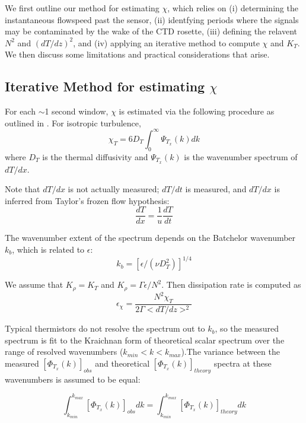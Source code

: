 \documentclass{ametsoc}
\begin{document}
We first outline our method for estimating $\chi$, which relies on (i) determining the instantaneous flowspeed past the sensor, (ii) identfying periods where the signals may be contaminated by the wake of the CTD rosette, (iii) defining the relavent $N^2$ and $(dT/dz)^2$, and (iv) applying an iterative method to compute $\chi$ and $K_T$. We then discuss some limitations and practical considerations that arise.

\subsection{Iterative Method for estimating $\chi$}

For each $\sim$1 second window, $\chi$ is estimated via the following procedure as outlined in \cite{moumnash09}. For isotropic turbulence,
\begin{equation}
\chi_T=6D_T \int_{0}^{\infty}\Psi_{T_x} (k) dk
\label{eq:chiint}
\end{equation}
where $D_T$ is the thermal diffusivity and $\Psi_{T_x} (k)$ is the wavenumber spectrum of $dT/dx$.

Note that $dT/dx$ is not actually measured; $dT/dt$ is measured, and $dT/dx$ is inferred from Taylor's frozen flow hypothesis:
 \begin{equation}
\frac{dT}{dx}=\frac{1}{u}\frac{dT}{dt}
\label{eq:2}
\end{equation}

The wavenumber extent of the spectrum depends on the Batchelor wavenumber $k_b$, which is related to $\epsilon$:
\begin{equation}
k_b=[\epsilon/(\nu D_{T}^{2})]^{1/4}
\label{eq:3}
\end{equation}

We assume that $K_{\rho}=K_T$ and $K_{\rho}=\Gamma \epsilon /N^2$. Then dissipation rate is computed as
\begin{equation}
\label{eq:eps}
\epsilon_{\chi}=\frac{N^2\chi_T}{2\Gamma <dT/dz>^2}
\end{equation}

Typical thermistors do not resolve the spectrum out to $k_b$, so the measured spectrum is fit to the Kraichnan form of theoretical scalar spectrum over the range of resolved wavenumbers ($k_{min}<k<k_{max}$).The variance between the measured $[\Phi_{T_x}(k)]_{obs}$ and theoretical $[\Phi_{T_x}(k)]_{theory}$ spectra at these wavenumbers is assumed to be equal:

\begin{equation}
\int^{k_{max}}_{k_{min}}[\Phi_{T_x}(k)]_{obs}dk=\int^{k_{max}}_{k_{min}}[\Phi_{T_x}(k)]_{theory}dk
\label{eq:speceq}
\end{equation}
\end{document}
